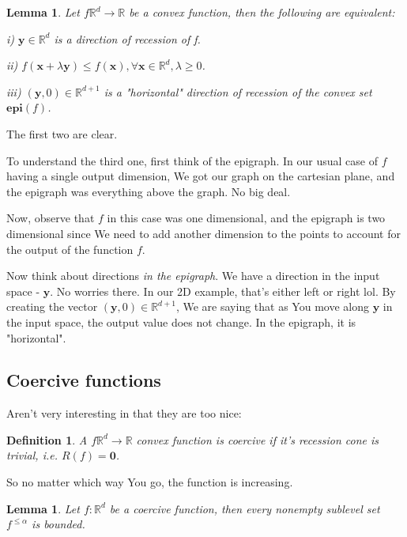\documentclass{article}
\newtheorem{definition}[theorem]{Definition}
\newtheorem{lemma}[theorem]{Lemma}
\begin{document}
		\begin{lemma}
			Let $f\mathbb{R}^d\to\mathbb{R}$ be a convex function, then the following are equivalent:
			
			i) $\mathbf{y}\in\mathbb{R}^d$ is a direction of recession of f.
			
			ii) $f(\mathbf{x}+\lambda\mathbf{y})\le f(\mathbf{x}),\forall\mathbf{x}\in\mathbb{R}^d, \lambda\ge 0$.
			
			iii) $(\mathbf{y}, 0)\in\mathbb{R}^{d+1}$ is a "horizontal" direction of recession of the convex set $\mathbf{epi}(f)$.
		\end{lemma}
		
		The first two are clear.
		
		To understand the third one, first think of the epigraph. In our usual case of $f$ having a single output dimension, We got our graph on the cartesian plane, and the epigraph was everything above the graph. No big deal.
		
		Now, observe that $f$ in this case was one dimensional, and the epigraph is two dimensional since We need to add another dimension to the points to account for the output of the function $f$.
		
		Now think about directions \textit{in the epigraph}. We have a direction in the input space - $\mathbf{y}$. No worries there. In our 2D example, that's either left or right lol. By creating the vector $(\mathbf{y}, 0)\in\mathbb{R}^{d+1}$, We are saying that as You move along $\mathbf{y}$ in the input space, the output value does not change. In the epigraph, it is "horizontal". 
		
	\subsection{Coercive functions}
	
		Aren't very interesting in that they are too nice:
		
		\begin{definition}
			A $f\mathbb{R}^d\to\mathbb{R}$ convex function is \textnormal{coercive} if it's recession cone is trivial, i.e. $R(f) = \mathbf{0}$.
		\end{definition}
		
		So no matter which way You go, the function is increasing. 
		
		\begin{lemma}
			Let $f:\mathbb{R}^d$ be a coercive function, then every nonempty sublevel set $f^{\le\alpha}$ is bounded.
		\end{lemma}
		
\end{document}
